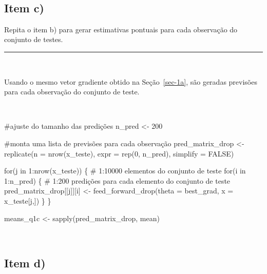 \documentclass[
  a4paperpaper,
]{article}
\newenvironment{Shaded}{\begin{snugshade}}{\end{snugshade}}
\newcommand{\AttributeTok}[1]{\textcolor[rgb]{0.40,0.45,0.13}{#1}}
\newcommand{\CommentTok}[1]{\textcolor[rgb]{0.37,0.37,0.37}{#1}}
\newcommand{\ConstantTok}[1]{\textcolor[rgb]{0.56,0.35,0.01}{#1}}
\newcommand{\ControlFlowTok}[1]{\textcolor[rgb]{0.00,0.23,0.31}{#1}}
\newcommand{\DecValTok}[1]{\textcolor[rgb]{0.68,0.00,0.00}{#1}}
\newcommand{\FunctionTok}[1]{\textcolor[rgb]{0.28,0.35,0.67}{#1}}
\newcommand{\NormalTok}[1]{\textcolor[rgb]{0.00,0.23,0.31}{#1}}
\newcommand{\OtherTok}[1]{\textcolor[rgb]{0.00,0.23,0.31}{#1}}
\newcommand{\SpecialCharTok}[1]{\textcolor[rgb]{0.37,0.37,0.37}{#1}}
\begin{document}
~

\subsection{Item c)}\label{item-c}

Repita o item b) para gerar estimativas pontuais para cada observação do
conjunto de testes.

\begin{center}\rule{0.5\linewidth}{0.5pt}\end{center}

~

Usando o mesmo vetor gradiente obtido na Seção~\ref{sec-1a}, são geradas
previsões para cada observação do conjunto de teste.

~

\begin{Shaded}
\begin{Highlighting}[]
\CommentTok{\#ajuste do tamanho das predições}
\NormalTok{n\_pred }\OtherTok{\textless{}{-}} \DecValTok{200}

\CommentTok{\#monta uma lista de previsões para cada observação}
\NormalTok{pred\_matrix\_drop }\OtherTok{\textless{}{-}} \FunctionTok{replicate}\NormalTok{(}\AttributeTok{n =} \FunctionTok{nrow}\NormalTok{(x\_teste), }\AttributeTok{expr =} \FunctionTok{rep}\NormalTok{(}\DecValTok{0}\NormalTok{, n\_pred), }\AttributeTok{simplify =} \ConstantTok{FALSE}\NormalTok{)}

\ControlFlowTok{for}\NormalTok{(j }\ControlFlowTok{in} \DecValTok{1}\SpecialCharTok{:}\FunctionTok{nrow}\NormalTok{(x\_teste)) \{ }\CommentTok{\# 1:10000 elementos do conjunto de teste}
  \ControlFlowTok{for}\NormalTok{(i }\ControlFlowTok{in} \DecValTok{1}\SpecialCharTok{:}\NormalTok{n\_pred) \{ }\CommentTok{\# 1:200 predições para cada elemento do conjunto de teste}
\NormalTok{    pred\_matrix\_drop[[j]][i] }\OtherTok{\textless{}{-}} \FunctionTok{feed\_forward\_drop}\NormalTok{(}\AttributeTok{theta =}\NormalTok{ best\_grad, }\AttributeTok{x =}\NormalTok{ x\_teste[j,])}
\NormalTok{  \}}
\NormalTok{\}}

\NormalTok{means\_q1c }\OtherTok{\textless{}{-}} \FunctionTok{sapply}\NormalTok{(pred\_matrix\_drop, mean)}
\end{Highlighting}
\end{Shaded}

~

\subsection{Item d)}\label{item-d}
\end{document}
